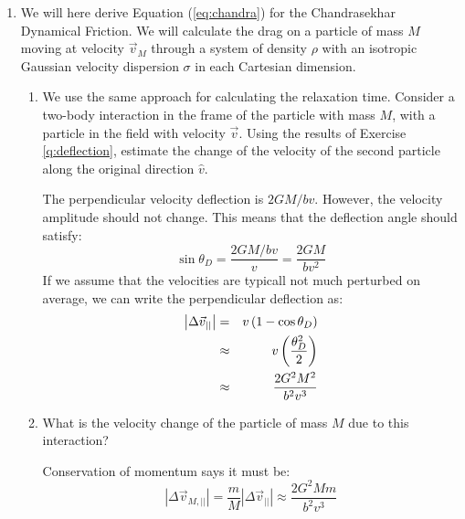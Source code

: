 \begin{enumerate}
\item We will here derive Equation (\ref{eq:chandra}) for the
Chandrasekhar Dynamical Friction. We will calculate the drag on a
particle of mass $M$ moving at velocity $\vec{v}_M$ through a system
of density $\rho$ with an isotropic Gaussian velocity dispersion
$\sigma$ in each Cartesian dimension.
\begin{enumerate}
\item We use the same approach for calculating the relaxation
time. Consider a two-body interaction in the frame of the particle
with mass $M$, with a particle in the field with velocity
$\vec{v}$. Using the results of Exercise \ref{q:deflection}, estimate
the change of the velocity of the second particle along the
original direction ${\hat v}$. 
\begin{answer}
The perpendicular velocity deflection is $2GM/bv$. However, the
velocity amplitude should not change. This means that the deflection
angle should satisfy:
\begin{equation}
\sin \theta_D = \frac{2GM/ bv}{v} = \frac{2GM}{bv^2}
\end{equation}
If we assume that the velocities are typicall not much perturbed on
average, we can write the perpendicular deflection as:
\begin{eqnarray}
\left|\Delta \vec{v}_{||}\right| &=&
v\left(1- \cos\theta_D\right) \cr
&\approx&
v\left(\frac{\theta_D^2}{2}\right) \cr
&\approx&
\frac{2G^2M^2}{b^2 v^3}
\end{eqnarray}
\end{answer}
\item What is the velocity change of the particle of mass $M$ due to
this interaction?
\begin{answer}
Conservation of momentum says it must be:
\begin{equation}
\left|\Delta \vec{v}_{M,||}\right| = \frac{m}{M} 
\left|\Delta \vec{v}_{||}\right| \approx
\frac{2G^2Mm }{b^2 v^3}
\end{equation}
\end{answer}


\end{enumerate}
\end{enumerate}
